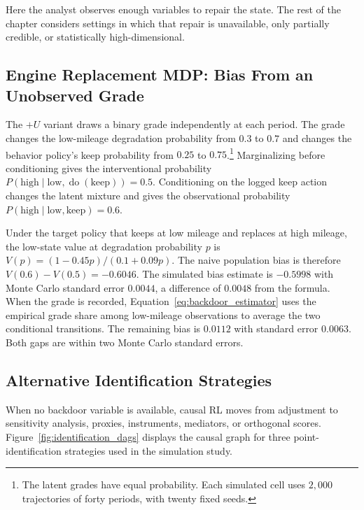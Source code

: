 Here the analyst observes enough variables to repair the state. The rest of the chapter considers settings in which that repair is unavailable, only partially credible, or statistically high-dimensional.

\FloatBarrier
\subsection{Engine Replacement MDP: Bias From an Unobserved Grade}
\label{engine:ch10}



The $+U$ variant draws a binary grade independently at each period. The grade changes the low-mileage degradation probability from $0.3$ to $0.7$ and changes the behavior policy's keep probability from $0.25$ to $0.75$.\footnote{The latent grades have equal probability. Each simulated cell uses $2{,}000$ trajectories of forty periods, with twenty fixed seeds.} Marginalizing before conditioning gives the interventional probability $P(\mathrm{high}\mid\mathrm{low},\operatorname{do}(\mathrm{keep}))=0.5$. Conditioning on the logged keep action changes the latent mixture and gives the observational probability $P(\mathrm{high}\mid\mathrm{low},\mathrm{keep})=0.6$.

Under the target policy that keeps at low mileage and replaces at high mileage, the low-state value at degradation probability $p$ is $V(p)=(1-0.45p)/(0.1+0.09p)$. The naive population bias is therefore $V(0.6)-V(0.5)=-0.6046$. The simulated bias estimate is $-0.5998$ with Monte Carlo standard error $0.0044$, a difference of $0.0048$ from the formula. When the grade is recorded, Equation~\eqref{eq:backdoor_estimator} uses the empirical grade share among low-mileage observations to average the two conditional transitions. The remaining bias is $0.0112$ with standard error $0.0063$. Both gaps are within two Monte Carlo standard errors.
\FloatBarrier

\subsection{Alternative Identification Strategies}
\label{subsec:alternative_identification}

When no backdoor variable is available, causal RL moves from adjustment to sensitivity analysis, proxies, instruments, mediators, or orthogonal scores. Figure~\ref{fig:identification_dags} displays the causal graph for three point-identification strategies used in the simulation study.

